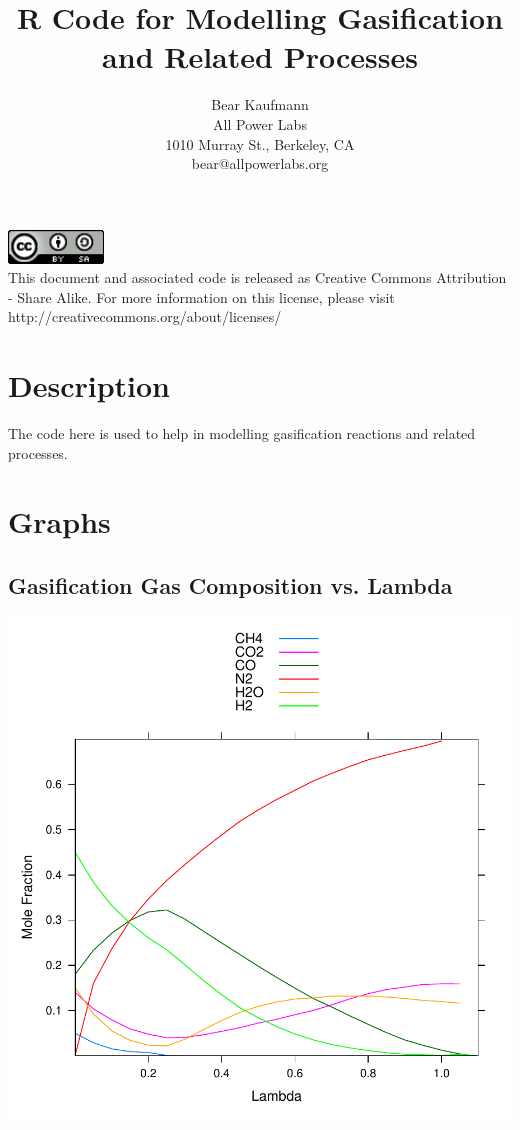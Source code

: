 \documentclass[a4paper]{article}
\title{R Code for Modelling Gasification and Related Processes}
\author{Bear Kaufmann\\
\normalsize{All Power Labs}\\
\normalsize{1010 Murray St., Berkeley, CA}\\
\normalsize{bear@allpowerlabs.org}
}
\begin{document}
\maketitle
\vfill
\begin{center}
\includegraphics[width=1in]{images/cc_by_sa.png}\\
This document and associated code is released as Creative Commons Attribution - Share Alike.
For more information on this license, please visit http://creativecommons.org/about/licenses/
\end{center}
\newpage
\section{Description}
The code here is used to help in modelling gasification reactions and related processes. 

\section{Graphs}
\subsection{Gasification Gas Composition vs. Lambda}
\includegraphics{images/img-001}
\\
\end{document}
